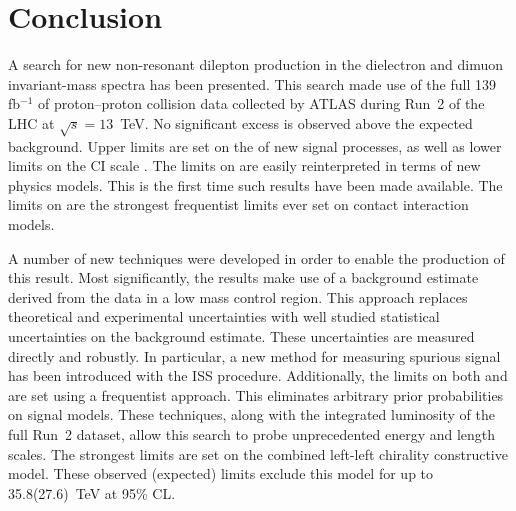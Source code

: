 \newpage
\section{Conclusion}\label{sec:ciConclusion}


A search for new non-resonant dilepton production in the dielectron and dimuon invariant-mass spectra has been presented.
This search made use of the full 139 fb$^{-1}$ of proton--proton collision data collected by ATLAS during Run~2 of the LHC at $\sqrt{s}=13$~TeV.
No significant excess is observed above the expected background.
Upper limits are set on the \xsbr of new signal processes, as well as lower limits on the CI scale \lam.
The limits on \xsbr are easily reinterpreted in terms of new physics models.
This is the first time such results have been made available.
The limits on \lam are the strongest frequentist limits ever set on contact interaction models.

A number of new techniques were developed in order to enable the production of this result.
Most significantly, the results make use of a background estimate derived from the data in a low mass control region.
This approach replaces theoretical and experimental uncertainties with well studied statistical uncertainties on the background estimate.
These uncertainties are measured directly and robustly.
In particular, a new method for measuring spurious signal has been introduced with the ISS procedure.
Additionally, the limits on both \xsbr and \lam are set using a frequentist approach.
This eliminates arbitrary prior probabilities on signal models.
These techniques, along with the integrated luminosity of the full Run~2 dataset, allow this search to probe unprecedented energy and length scales.
The strongest limits are set on the combined left-left chirality constructive model.
These observed (expected) limits exclude this model for \lam up to 35.8(27.6)~TeV at 95\% CL.

